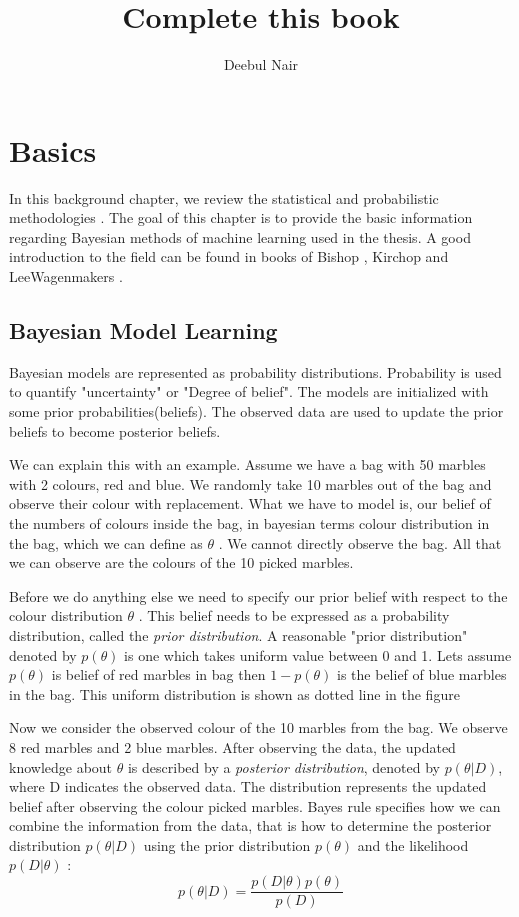 \documentclass[11pt]{report}
\title{\textbf{Complete this book }}
\author{Deebul Nair}
\date{}
\begin{document}
\maketitle


\chapter{Basics}

In this background chapter, we review the statistical and probabilistic methodologies .
The goal of this chapter is to provide the basic information regarding Bayesian methods of machine learning used in the thesis. A good introduction to the field can be found in books of Bishop \cite{}, Kirchop \cite{} and LeeWagenmakers \cite{} . 

\section{Bayesian Model Learning}

Bayesian models are represented as probability distributions. Probability is used to quantify "uncertainty" or "Degree of belief". The models are initialized with some prior probabilities(beliefs). The observed data are used to update the prior beliefs to become posterior beliefs.

We can explain this with an example. Assume we have a bag with 50 marbles with 2 colours, red and blue. We randomly take 10 marbles out of the bag and observe their colour with replacement. What we have to model is, our belief of the numbers of colours inside the bag, in bayesian  terms colour distribution in the bag, which we can define as $\theta$ . We cannot directly observe the bag. All that we can observe are the colours of the 10 picked marbles.

Before we do anything else we need to specify our prior belief with respect to the colour distribution $\theta$ . This belief needs to be expressed as a probability distribution, called the \emph{prior distribution}. A reasonable "prior distribution" denoted by $p(\theta)$ is one which takes uniform value between 0 and 1. Lets assume $p(\theta)$ is belief of red marbles in bag then $1 - p(\theta)$  is the belief of blue marbles in the bag. This uniform distribution is shown as dotted line in the figure 

Now we consider the observed colour of the 10 marbles from the bag. We observe 8 red marbles and 2 blue marbles. After observing the data, the updated knowledge about $\theta$ is described by a \emph{posterior distribution}, denoted by $p(\theta | D)$, where D indicates the observed data. The distribution represents the updated belief after observing the colour picked marbles. Bayes rule specifies how we can combine the information from the data, that is how to determine the posterior distribution $p (\theta | D)$ using  the prior distribution $p(\theta)$ and the likelihood  $p (D | \theta)$ :
\begin{equation}
	p(\theta | D) = \frac{p(D | \theta) p(\theta)}{p(D)}
\end{equation}
\end{document}
